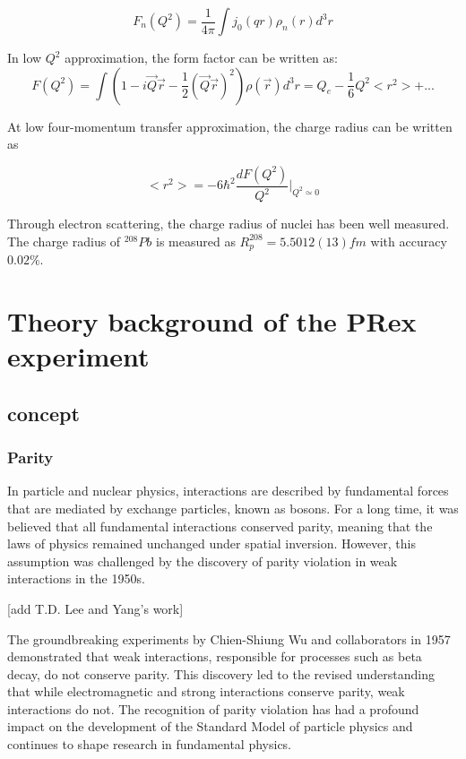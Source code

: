 \begin{equation}
    F_n(Q^2) = \frac{1}{4\pi}\int{j_0(qr)\rho_n(r)}d^3r
\end{equation}

In low $Q^2$ approximation, the form factor can be written as:
\begin{equation}
    F(Q^2) = \int{(1-i\Vec{Q}\Vec{r} - \frac{1}{2}(\Vec{Q}\Vec{r})^2)\rho(\Vec{r})}d^3r = Q_e - \frac{1}{6}Q^2<r^2> + ...
\end{equation}

At low four-momentum transfer approximation, the charge radius can be written as

\begin{equation}
    <r^2> = -6\hbar^2\frac{dF(Q^2)}{Q^2}|_{Q^2\simeq0}
\end{equation}

Through electron scattering, the charge radius of nuclei has been well measured. The charge radius of $^{208}Pb$ is measured as $R^{208}_{p} = 5.5012(13)fm$ with accuracy $0.02\%$\cite{ANGELI201369}.


\section{Theory background of the PRex experiment}

\subsection{concept}
\subsubsection{Parity}
In particle and nuclear physics, interactions are described by fundamental forces that are mediated by exchange particles, known as bosons. For a long time, it was believed that all fundamental interactions conserved parity, meaning that the laws of physics remained unchanged under spatial inversion. However, this assumption was challenged by the discovery of parity violation in weak interactions in the 1950s.

[add T.D. Lee and Yang's work]

The groundbreaking experiments by Chien-Shiung Wu and collaborators in 1957 demonstrated that weak interactions, responsible for processes such as beta decay, do not conserve parity. This discovery led to the revised understanding that while electromagnetic and strong interactions conserve parity, weak interactions do not. The recognition of parity violation has had a profound impact on the development of the Standard Model of particle physics and continues to shape research in fundamental physics.

